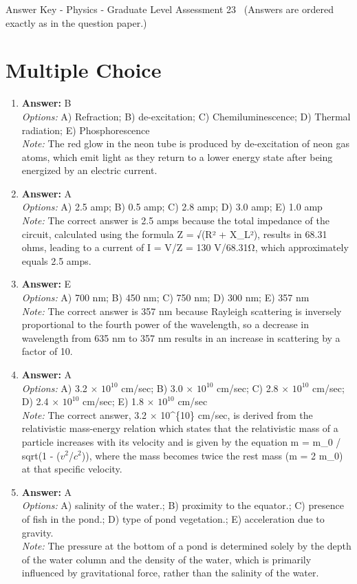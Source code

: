 \documentclass[12pt]{article}
\begin{document}
\begin{center}
Answer Key - Physics - Graduate Level Assessment 23 \
\small (Answers are ordered exactly as in the question paper.)
\end{center}

\section*{Multiple Choice}
\begin{enumerate}[label=\arabic*.]
\item \textbf{Answer:} B
\\ \textit{Options:} A) Refraction; B) de-excitation; C) Chemiluminescence; D) Thermal radiation; E) Phosphorescence
\\ \textit{Note:} The red glow in the neon tube is produced by de-excitation of neon gas atoms, which emit light as they return to a lower energy state after being energized by an electric current.
\item \textbf{Answer:} A
\\ \textit{Options:} A) 2.5 amp; B) 0.5 amp; C) 2.8 amp; D) 3.0 amp; E) 1.0 amp
\\ \textit{Note:} The correct answer is 2.5 amps because the total impedance of the circuit, calculated using the formula Z = √(R² + X\_L²), results in 68.31 ohms, leading to a current of I = V/Z = 130 V/68.31Ω, which approximately equals 2.5 amps.
\item \textbf{Answer:} E
\\ \textit{Options:} A) 700 nm; B) 450 nm; C) 750 nm; D) 300 nm; E) 357 nm
\\ \textit{Note:} The correct answer is 357 nm because Rayleigh scattering is inversely proportional to the fourth power of the wavelength, so a decrease in wavelength from 635 nm to 357 nm results in an increase in scattering by a factor of 10.
\item \textbf{Answer:} A
\\ \textit{Options:} A) 3.2 \ensuremath{\times} $10^10$ cm/sec; B) 3.0 \ensuremath{\times} $10^10$ cm/sec; C) 2.8 \ensuremath{\times} $10^10$ cm/sec; D) 2.4 \ensuremath{\times} $10^10$ cm/sec; E) 1.8 \ensuremath{\times} $10^10$ cm/sec
\\ \textit{Note:} The correct answer, 3.2 \ensuremath{\times} 10^\{10\} cm/sec, is derived from the relativistic mass-energy relation which states that the relativistic mass of a particle increases with its velocity and is given by the equation m = m\_0 / sqrt(1 - ($v^2$/$c^2$)), where the mass becomes twice the rest mass (m = 2 m\_0) at that specific velocity.
\item \textbf{Answer:} A
\\ \textit{Options:} A) salinity of the water.; B) proximity to the equator.; C) presence of fish in the pond.; D) type of pond vegetation.; E) acceleration due to gravity.
\\ \textit{Note:} The pressure at the bottom of a pond is determined solely by the depth of the water column and the density of the water, which is primarily influenced by gravitational force, rather than the salinity of the water.
\end{enumerate}
\end{document}
